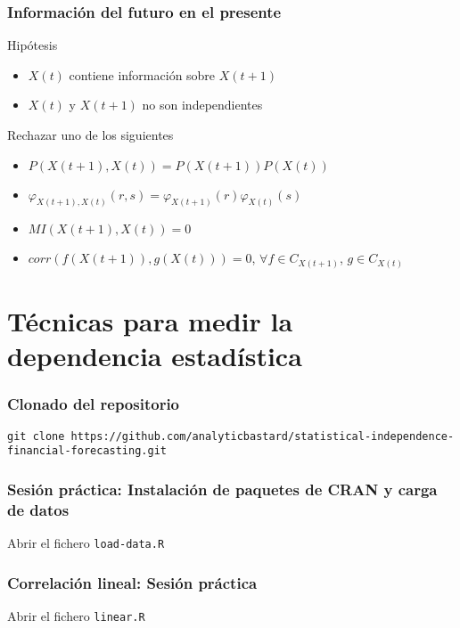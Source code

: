 \documentclass[t,9pt,pdftex]{beamer}
\begin{document}
\begin{frame}[c]
	\frametitle{Informaci\'on del futuro en el presente}	
	\begin{block}{Hip\'otesis}
		\begin{itemize}
		\item $X(t)$ contiene informaci\'on sobre $X(t+1)$
		\item $X(t)$ y $X(t+1)$ no son independientes
		\end{itemize}
	\end{block}
	
	\begin{exampleblock}{Rechazar uno de los siguientes}
		\begin{itemize}
		\item $P(X(t+1),X(t)) = P(X(t+1))P(X(t))$
		\item $\varphi_{X(t+1),X(t)}(r,s) = \varphi_{X(t+1)}(r)\varphi_{X(t)}(s)$
		\item $MI(X(t+1),X(t))=0$
		\item $corr(f(X(t+1)), g(X(t))) = 0$, $\forall f \in C_{X(t+1)}$, $g \in C_{X(t)}$
		\end{itemize}
	\end{exampleblock}
\end{frame}


\section{T\'ecnicas para medir la dependencia estad\'istica}


\begin{frame}[c,containsverbatim]
\frametitle{Clonado del repositorio}
	\begin{lstlisting}
git clone https://github.com/analyticbastard/statistical-independence-financial-forecasting.git
	\end{lstlisting}
		
\end{frame}

\begin{frame}[c,containsverbatim]
\frametitle{Sesi\'on pr\'actica: Instalaci\'on de paquetes de CRAN y carga de datos}
	Abrir el fichero \texttt{load-data.R}
		
\end{frame}

\begin{frame}[c,containsverbatim]
\frametitle{Correlaci\'on lineal: Sesi\'on pr\'actica}
	Abrir el fichero \texttt{linear.R}
\end{frame}
\end{document}

